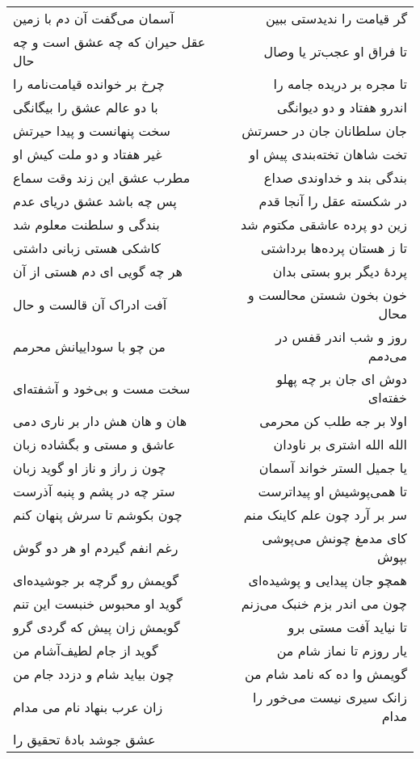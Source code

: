 \begin{center}
\begin{longtable}{l p{0.5cm} r}
آسمان می‌گفت آن دم با زمین
&&
گر قیامت را ندیدستی ببین
\\
عقل حیران که چه عشق است و چه حال
&&
تا فراق او عجب‌تر یا وصال
\\
چرخ بر خوانده قیامت‌نامه را
&&
تا مجره بر دریده جامه را
\\
با دو عالم عشق را بیگانگی
&&
اندرو هفتاد و دو دیوانگی
\\
سخت پنهانست و پیدا حیرتش
&&
جان سلطانان جان در حسرتش
\\
غیر هفتاد و دو ملت کیش او
&&
تخت شاهان تخته‌بندی پیش او
\\
مطرب عشق این زند وقت سماع
&&
بندگی بند و خداوندی صداع
\\
پس چه باشد عشق دریای عدم
&&
در شکسته عقل را آنجا قدم
\\
بندگی و سلطنت معلوم شد
&&
زین دو پرده عاشقی مکتوم شد
\\
کاشکی هستی زبانی داشتی
&&
تا ز هستان پرده‌ها برداشتی
\\
هر چه گویی ای دم هستی از آن
&&
پردهٔ دیگر برو بستی بدان
\\
آفت ادراک آن قالست و حال
&&
خون بخون شستن محالست و محال
\\
من چو با سوداییانش محرمم
&&
روز و شب اندر قفس در می‌دمم
\\
سخت مست و بی‌خود و آشفته‌ای
&&
دوش ای جان بر چه پهلو خفته‌ای
\\
هان و هان هش دار بر ناری دمی
&&
اولا بر جه طلب کن محرمی
\\
عاشق و مستی و بگشاده زبان
&&
الله الله اشتری بر ناودان
\\
چون ز راز و ناز او گوید زبان
&&
یا جمیل الستر خواند آسمان
\\
ستر چه در پشم و پنبه آذرست
&&
تا همی‌پوشیش او پیداترست
\\
چون بکوشم تا سرش پنهان کنم
&&
سر بر آرد چون علم کاینک منم
\\
رغم انفم گیردم او هر دو گوش
&&
کای مدمغ چونش می‌پوشی بپوش
\\
گویمش رو گرچه بر جوشیده‌ای
&&
همچو جان پیدایی و پوشیده‌ای
\\
گوید او محبوس خنبست این تنم
&&
چون می اندر بزم خنبک می‌زنم
\\
گویمش زان پیش که گردی گرو
&&
تا نیاید آفت مستی برو
\\
گوید از جام لطیف‌آشام من
&&
یار روزم تا نماز شام من
\\
چون بیاید شام و دزدد جام من
&&
گویمش وا ده که نامد شام من
\\
زان عرب بنهاد نام می مدام
&&
زانک سیری نیست می‌خور را مدام
\\
عشق جوشد بادهٔ تحقیق را
&&

\end{longtable}
\end{center}
